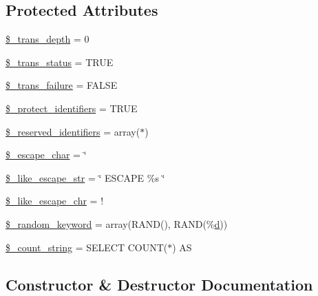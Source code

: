 \subsection*{Protected Attributes}
\begin{DoxyCompactItemize}
\item 
\hyperlink{class_c_i___d_b__driver_a0724b7f82d62f35ef5e150146ed2a27b}{\$\+\_\+trans\+\_\+depth} = 0
\item 
\hyperlink{class_c_i___d_b__driver_a93acf0189d34131e156c6eb4a48c2b5b}{\$\+\_\+trans\+\_\+status} = T\+R\+U\+E
\item 
\hyperlink{class_c_i___d_b__driver_afb63c722ff858ef7a4f662ec2930aad3}{\$\+\_\+trans\+\_\+failure} = F\+A\+L\+S\+E
\item 
\hyperlink{class_c_i___d_b__driver_a2e8a156a3c2abda43a4f160bcb5252e9}{\$\+\_\+protect\+\_\+identifiers} = T\+R\+U\+E
\item 
\hyperlink{class_c_i___d_b__driver_aa3298c4c62fbee8bb09f1b75b633fb0d}{\$\+\_\+reserved\+\_\+identifiers} = array(\textquotesingle{}$\ast$\textquotesingle{})
\item 
\hyperlink{class_c_i___d_b__driver_aaec2fb0112850159063a8e47ad3aed6e}{\$\+\_\+escape\+\_\+char} = \textquotesingle{}\char`\"{}\textquotesingle{}
\item 
\hyperlink{class_c_i___d_b__driver_adf86ecadf3d0e1ce3f5e0eaeeb3867ae}{\$\+\_\+like\+\_\+escape\+\_\+str} = \char`\"{} E\+S\+C\+A\+P\+E \textquotesingle{}\%s\textquotesingle{} \char`\"{}
\item 
\hyperlink{class_c_i___d_b__driver_a668acfd923d0342389cd3a614628cf2a}{\$\+\_\+like\+\_\+escape\+\_\+chr} = \textquotesingle{}!\textquotesingle{}
\item 
\hyperlink{class_c_i___d_b__driver_a10213aa6e05f6d924d3277bb1d2fea00}{\$\+\_\+random\+\_\+keyword} = array(\textquotesingle{}R\+A\+N\+D()\textquotesingle{}, \textquotesingle{}R\+A\+N\+D(\%\hyperlink{jquery_8canvasjs_8min_8js_a36541169dfff685f807208881a4f0021}{d})\textquotesingle{})
\item 
\hyperlink{class_c_i___d_b__driver_a06c80bac2ecbd0557827e96949c23097}{\$\+\_\+count\+\_\+string} = \textquotesingle{}S\+E\+L\+E\+C\+T C\+O\+U\+N\+T($\ast$) A\+S \textquotesingle{}
\end{DoxyCompactItemize}


\subsection{Constructor \& Destructor Documentation}
\hypertarget{class_c_i___d_b__driver_a9162320adff1a1a4afd7f2372f753a3e}{}

